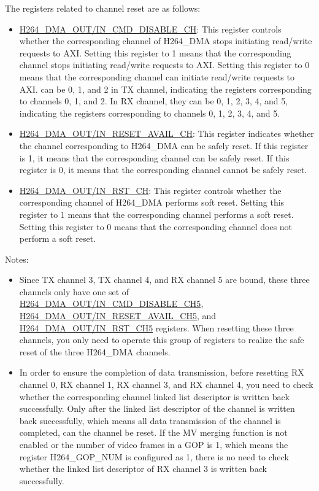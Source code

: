 \documentclass[main\_\_EN.tex]{subfiles}
\begin{document}
The registers related to channel reset are as follows:
\begin{itemize}
    \item \hyperref[fielddesc:H264DMAOUTCMDDISABLECH0]{H264\_DMA\_OUT/IN\_CMD\_DISABLE\_CH}: This register controls whether the corresponding channel of H264\_DMA stops initiating read/write requests to AXI. Setting this register to 1 means that the corresponding channel stops initiating read/write requests to AXI. Setting this register to 0 means that the corresponding channel can initiate read/write requests to AXI.  can be 0, 1, and 2 in TX channel, indicating the registers corresponding to channels 0, 1, and 2. In RX channel, they can be 0, 1, 2, 3, 4, and 5, indicating the registers corresponding to channels 0, 1, 2, 3, 4, and 5.
    \item \hyperref[fielddesc:H264DMAOUTRESETAVAILCH0]{H264\_DMA\_OUT/IN\_RESET\_AVAIL\_CH}: This register indicates whether the channel corresponding to H264\_DMA can be safely reset. If this register is 1, it means that the corresponding channel can be safely reset. If this register is 0, it means that the corresponding channel cannot be safely reset.
    \item \hyperref[fielddesc:H264DMAOUTRSTCH0]{H264\_DMA\_OUT/IN\_RST\_CH}: This register controls whether the corresponding channel of H264\_DMA performs soft reset. Setting this register to 1 means that the corresponding channel performs a soft reset. Setting this register to 0 means that the corresponding channel does not perform a soft reset.
\end{itemize}

Notes:
\begin{itemize}
    \item Since TX channel 3, TX channel 4, and RX channel 5 are bound, these three channels only have one set of \hyperref[fielddesc:H264DMAINCMDDISABLECH5]{H264\_DMA\_OUT/IN\_CMD\_DISABLE\_CH5}, \hyperref[fielddesc:H264DMAINRESETAVAILCH5]{H264\_DMA\_OUT/IN\_RESET\_AVAIL\_CH5}, and \hyperref[fielddesc:H264DMAINRSTCH5]{H264\_DMA\_OUT/IN\_RST\_CH5} registers. When resetting these three channels, you only need to operate this group of registers to realize the safe reset of the three H264\_DMA channels.
    \item In order to ensure the completion of data transmission, before resetting RX channel 0, RX channel 1, RX channel 3, and RX channel 4, you need to check whether the corresponding channel linked list descriptor is written back successfully. Only after the linked list descriptor of the channel is written back successfully, which means all data transmission of the channel is completed, can the channel be reset. If the MV merging function is not enabled or the number of video frames in a GOP is 1, which means the register H264\_GOP\_NUM is configured as 1, there is no need to check whether the linked list descriptor of RX channel 3 is written back successfully.
\end{itemize}
\end{document}
